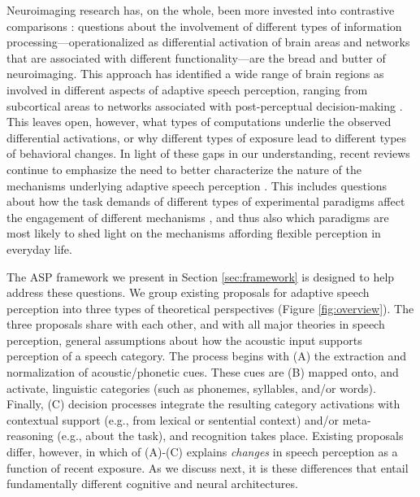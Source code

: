 \documentclass[
  11pt,
  man,floatsintext]{apa6}
\begin{document}
Neuroimaging research has, on the whole, been more invested into contrastive comparisons \autocites[e.g.,][]{bonte2017,erb2013brain,guediche2015evidence,myers-mesite2014}: questions about the involvement of different types of information processing---operationalized as differential activation of brain areas and networks that are associated with different functionality---are the bread and butter of neuroimaging. This approach has identified a wide range of brain regions as involved in different aspects of adaptive speech perception, ranging from subcortical areas \autocites[e.g.,][]{skoe2021auditory,guediche2015evidence} to networks associated with post-perceptual decision-making \autocites[e.g.,][]{blanco-elorriera2021,myers-mesite2014,erb2013brain}. This leaves open, however, what types of computations underlie the observed differential activations, or why different types of exposure lead to different types of behavioral changes. In light of these gaps in our understanding, recent reviews continue to emphasize the need to better characterize the nature of the mechanisms underlying adaptive speech perception \autocites[from, e.g.,][]{samuel-kraljic2009}[to][]{weatherholtz-jaeger2016}[to][]{baeseberk2020}. This includes questions about how the task demands of different types of experimental paradigms affect the engagement of different mechanisms \autocite{baeseberk2018,zheng-samuel2020}, and thus also which paradigms are most likely to shed light on the mechanisms affording flexible perception in everyday life.

The ASP framework we present in Section \ref{sec:framework} is designed to help address these questions. We group existing proposals for adaptive speech perception into three types of theoretical perspectives (Figure \ref{fig:overview}). The three proposals share with each other, and with all major theories in speech perception, general assumptions about how the acoustic input supports perception of a speech category. The process begins with (A) the extraction and normalization of acoustic/phonetic cues. These cues are (B) mapped onto, and activate, linguistic categories (such as phonemes, syllables, and/or words). Finally, (C) decision processes integrate the resulting category activations with contextual support (e.g., from lexical or sentential context) and/or meta-reasoning (e.g., about the task), and recognition takes place. Existing proposals differ, however, in which of (A)-(C) explains \emph{changes} in speech perception as a function of recent exposure. As we discuss next, it is these differences that entail fundamentally different cognitive and neural architectures.
\end{document}
